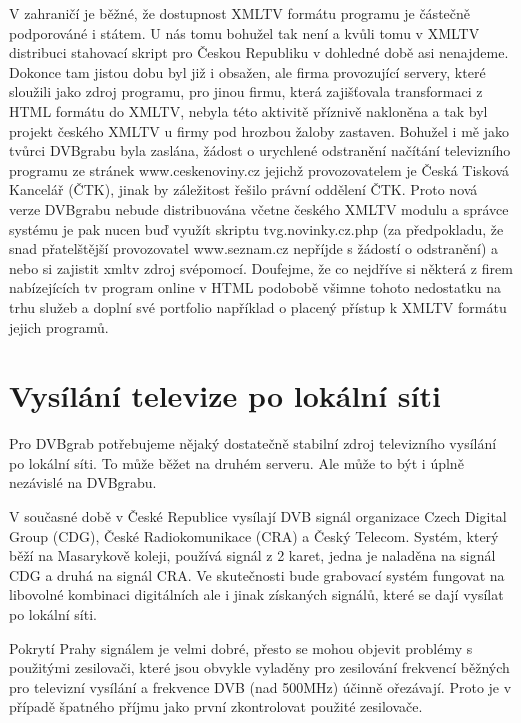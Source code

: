 V zahraničí je běžné, že dostupnost XMLTV formátu programu je částečně podporováné i státem. U nás tomu bohužel tak není a kvůli tomu v XMLTV distribuci stahovací skript pro Českou Republiku v dohledné době asi nenajdeme. Dokonce tam jistou dobu byl již i obsažen, ale firma provozující servery, které sloužili jako zdroj programu, pro jinou firmu, která zajišťovala transformaci z HTML formátu do XMLTV, nebyla této aktivitě příznivě nakloněna a tak byl projekt českého XMLTV u firmy pod hrozbou žaloby zastaven. Bohužel i mě jako tvůrci DVBgrabu byla zaslána, žádost o urychlené odstranění načítání televizního programu ze stránek www.ceskenoviny.cz jejichž provozovatelem je Česká Tisková Kancelář (ČTK), jinak by záležitost řešilo právní oddělení ČTK. Proto nová verze DVBgrabu nebude distribuována včetne českého XMLTV modulu a správce systému je pak nucen buď využít skriptu tvg.novinky.cz.php (za předpokladu, že snad přatelštější provozovatel www.seznam.cz nepříjde s žádostí o odstranění) a nebo si zajistit xmltv zdroj svépomocí. Doufejme, že co nejdříve si některá z firem nabízejících tv program online v HTML podobobě všimne tohoto nedostatku na trhu služeb a doplní své portfolio například o placený přístup k XMLTV formátu jejich programů.

\vspace{10pt}

\section{Vysílání televize po lokální síti}

Pro DVBgrab potřebujeme nějaký dostatečně stabilní zdroj televizního vysílání po lokální síti. To může běžet na druhém serveru. Ale může to být i úplně nezávislé na DVBgrabu.

\vspace{10pt}

V současné době v České Republice vysílají DVB signál organizace Czech Digital Group (CDG), České Radiokomunikace (CRA) a Český Telecom. Systém, který běží na Masarykově koleji, používá signál z 2 karet, jedna je naladěna na signál CDG a druhá na signál CRA. Ve skutečnosti bude grabovací systém fungovat na libovolné kombinaci digitálních ale i jinak získaných signálů, které se dají vysílat po lokální síti.

\vspace{10pt}

Pokrytí Prahy signálem je velmi dobré, přesto se mohou objevit problémy s použitými zesilovači, které jsou obvykle vyladěny pro zesilování frekvencí běžných pro televizní vysílání a frekvence DVB (nad 500MHz) účinně ořezávají. Proto je v případě špatného příjmu jako první zkontrolovat použité zesilovače.

